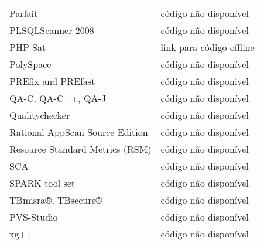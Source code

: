 \documentclass[12pt]{article}
\begin{document}
\begin{table}
\begin{tabular}{| l | l |}
Parfait                   & código não disponível \\
PLSQLScanner 2008         & código não disponível \\
PHP-Sat                   & link para código offline \\
PolySpace                 & código não disponível \\
PREfix and PREfast        & código não disponivel \\
QA-C, QA-C++, QA-J        & código não disponível \\
Qualitychecker            & código não disponível \\
Rational AppScan Source Edition & código não disponível \\
Resource Standard Metrics (RSM) & código não disponível \\
SCA                       & código não disponível \\
SPARK tool set            & código não disponível \\
TBmisra®, TBsecure®       & código não disponível \\
PVS-Studio                & código não disponível \\
xg++                      & código não disponível \\
\hline
\end{tabular}
\label{ferramentas-do-nist-sem-codigo}
\end{table}
\end{document}
